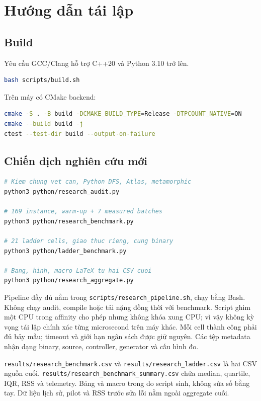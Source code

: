 \chapter{Hướng dẫn tái lập}

\section{Build}

Yêu cầu GCC/Clang hỗ trợ C++20 và Python 3.10 trở lên.
\begin{lstlisting}[language=bash,numbers=none]
bash scripts/build.sh
\end{lstlisting}
Trên máy có CMake backend:
\begin{lstlisting}[language=bash,numbers=none]
cmake -S . -B build -DCMAKE_BUILD_TYPE=Release -DTPCOUNT_NATIVE=ON
cmake --build build -j
ctest --test-dir build --output-on-failure
\end{lstlisting}

\section{Chiến dịch nghiên cứu mới}

\begin{lstlisting}[language=bash,numbers=none]
# Kiem chung vet can, Python DFS, Atlas, metamorphic
python3 python/research_audit.py

# 169 instance, warm-up + 7 measured batches
python3 python/research_benchmark.py

# 21 ladder cells, giao thuc rieng, cung binary
python3 python/ladder_benchmark.py

# Bang, hinh, macro LaTeX tu hai CSV cuoi
python3 python/research_aggregate.py
\end{lstlisting}

Pipeline đầy đủ nằm trong \nolinkurl{scripts/research_pipeline.sh}, chạy bằng Bash. Không chạy audit, compile hoặc tải nặng đồng thời với benchmark. Script ghim một CPU trong affinity cho phép nhưng không khóa xung CPU; vì vậy không kỳ vọng tái lập chính xác từng microsecond trên máy khác. Mỗi cell thành công phải đủ bảy mẫu; timeout và giới hạn ngân sách được giữ nguyên. Các tệp metadata nhận dạng binary, source, controller, generator và cấu hình đo.

\nolinkurl{results/research_benchmark.csv} và \nolinkurl{results/research_ladder.csv} là hai CSV nguồn cuối. \nolinkurl{results/research_benchmark_summary.csv} chứa median, quartile, IQR, RSS và telemetry. Bảng và macro trong  do script sinh, không sửa số bằng tay. Dữ liệu lịch sử, pilot và RSS trước sửa lỗi nằm ngoài aggregate cuối.

